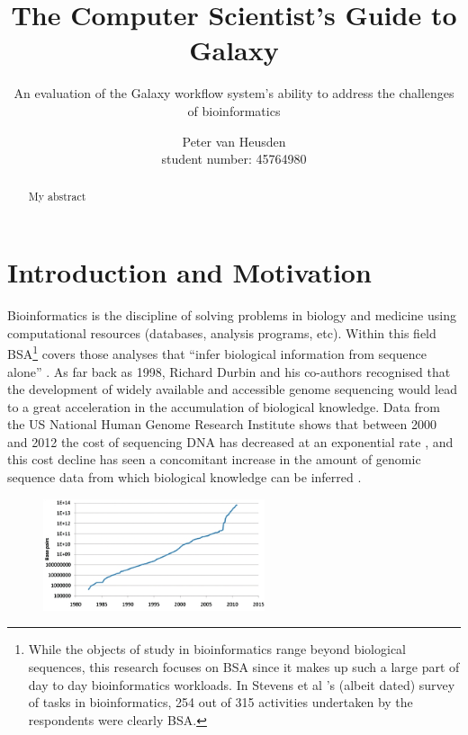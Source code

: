 \documentclass[a4paper,10pt]{scrreprt}
\title{The Computer Scientist's Guide to Galaxy}
\subtitle{An evaluation of the Galaxy workflow system's ability to address the challenges of bioinformatics}
\author{Peter van Heusden\\
student number: 45764980}
\begin{document}


\maketitle

\begin{abstract}
My abstract
\end{abstract}

\tableofcontents

\listoffigures

\chapter{Introduction and Motivation}


Bioinformatics is the discipline of solving problems in biology and medicine using computational resources (databases, analysis programs, etc). Within this field \gls{BSA}\footnote{While the objects of study in bioinformatics range beyond biological sequences, this research focuses on \gls{BSA} since it makes up such a large part of day to day bioinformatics workloads. In Stevens et al \cite{stevens_classification_2001}'s (albeit dated) survey of tasks in bioinformatics, 254 out of 315 activities undertaken by the respondents were clearly \gls{BSA}.} covers those analyses that ``infer biological information from sequence alone'' \cite[p.~1]{durbin_biological_1998}. As far back as 1998, Richard Durbin and his co-authors recognised that the development of widely available and accessible genome sequencing would lead to a great acceleration in the accumulation of biological knowledge. Data from the US National Human Genome Research Institute shows that between 2000 and 2012 the cost of \gls{sequencing} \gls{DNA} has decreased at an exponential rate \cite{national_human_genome_research_institute_dna_2012}, and this cost decline has seen a concomitant increase in the amount of genomic sequence data from which biological knowledge can be inferred \cite{cochrane_international_2010}. \begin{figure}
  \vspace{-10pt}
  \centering
    \includegraphics[width=0.58\textwidth]{images/seqgrowth.png}

\end{figure}
\end{document}
